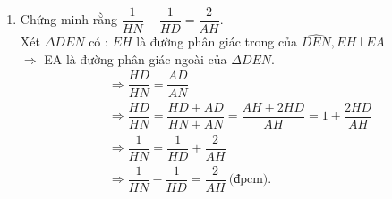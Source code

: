 \begin{ex}
{\begin{enumerate}
			\item Chứng minh rằng $\dfrac{1}{HN}-\dfrac{1}{HD}=\dfrac{2}{AH}.$\\
					Xét $\Delta DEN$ có : $EH$ là đường phân giác trong của $\widehat{DEN}, EH\bot EA$\\
					$\Rightarrow$ EA là đường phân giác ngoài của $\Delta DEN.$
					\begin{align*} &\Rightarrow \dfrac{HD}{HN}=\dfrac{AD}{AN}\\ &\Rightarrow \dfrac{HD}{HN}=\dfrac{HD+AD}{HN+AN}=\dfrac{AH+2HD}{AH}=1+\dfrac{2HD}{AH}\\
					&\Rightarrow \dfrac{1}{HN}=\dfrac{1}{HD}+\dfrac{2}{AH}\\&\Rightarrow \dfrac{1}{HN}-\dfrac{1}{HD}=\dfrac{2}{AH} ~\text {(đpcm)}.
					\end{align*}
		\end{enumerate}
		}
	\end{ex}
